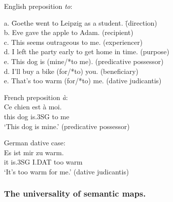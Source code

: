 \ea
English preposition {\em to}:
\label{e:to-dative}
\begin{tabbing}
a. \hspace{0,3cm}    \= Goethe went to Leipzig as a student.  \hspace{1cm} \= (direction)\\
b. \> Eve gave the apple to Adam. \> (recipient)\\
c. \> This seems outrageous to me. \> (experiencer)\\
d. \> I left the party early to get home in time. \> (purpose)\\
e. \> This dog is (mine/*to me). \> (predicative possessor)\\
d. \> I'll buy a bike (for/*to) you. \> (beneficiary) \\
e. \> That's too warm (for/*to) me. \> (dative judicantis)\\
\end{tabbing}
\item French preposition {\em \`{a}}:
\\
\gll Ce chien est \`{a} moi.\\
this dog is.3SG to me\\
\glt `This dog is mine.' (predicative possessor)\\

\item German dative case:
\\
\gll Es ist mir zu warm.\\
it is.3SG I.DAT too warm\\
\glt `It's too warm for me.' (dative judicantis)\\
\z

\subsubsection{The universality of semantic maps.}

